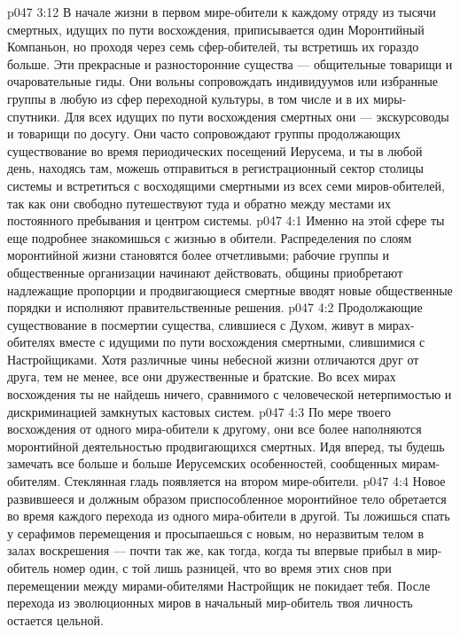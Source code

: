 \vs p047 3:12 В начале жизни в первом мире\hyp{}обители к каждому отряду из тысячи смертных, идущих по пути восхождения, приписывается один Моронтийный Компаньон, но проходя через семь сфер\hyp{}обителей, ты встретишь их гораздо больше. Эти прекрасные и разносторонние существа --- общительные товарищи и очаровательные гиды. Они вольны сопровождать индивидуумов или избранные группы в любую из сфер переходной культуры, в том числе и в их миры\hyp{}спутники. Для всех идущих по пути восхождения смертных они --- экскурсоводы и товарищи по досугу. Они часто сопровождают группы продолжающих существование во время периодических посещений Иерусема, и ты в любой день, находясь там, можешь отправиться в регистрационный сектор столицы системы и встретиться с восходящими смертными из всех семи миров\hyp{}обителей, так как они свободно путешествуют туда и обратно между местами их постоянного пребывания и центром системы.
\vs p047 4:1 Именно на этой сфере ты еще подробнее знакомишься с жизнью в обители. Распределения по слоям моронтийной жизни становятся более отчетливыми; рабочие группы и общественные организации начинают действовать, общины приобретают надлежащие пропорции и продвигающиеся смертные вводят новые общественные порядки и исполняют правительственные решения.
\vs p047 4:2 Продолжающие существование в посмертии существа, слившиеся с Духом, живут в мирах\hyp{}обителях вместе с идущими по пути восхождения смертными, слившимися с Настройщиками. Хотя различные чины небесной жизни отличаются друг от друга, тем не менее, все они дружественные и братские. Во всех мирах восхождения ты не найдешь ничего, сравнимого с человеческой нетерпимостью и дискриминацией замкнутых кастовых систем.
\vs p047 4:3 По мере твоего восхождения от одного мира\hyp{}обители к другому, они все более наполняются моронтийной деятельностью продвигающихся смертных. Идя вперед, ты будешь замечать все больше и больше Иерусемских особенностей, сообщенных мирам\hyp{}обителям. Стеклянная гладь появляется на втором мире\hyp{}обители.
\vs p047 4:4 Новое развившееся и должным образом приспособленное моронтийное тело обретается во время каждого перехода из одного мира\hyp{}обители в другой. Ты ложишься спать у серафимов перемещения и просыпаешься с новым, но неразвитым телом в залах воскрешения --- почти так же, как тогда, когда ты впервые прибыл в мир\hyp{}обитель номер один, с той лишь разницей, что во время этих снов при перемещении между мирами\hyp{}обителями Настройщик не покидает тебя. После перехода из эволюционных миров в начальный мир\hyp{}обитель твоя личность остается цельной.
